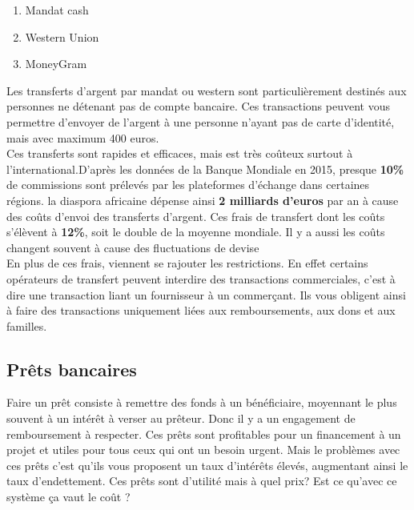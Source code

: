 \documentclass[12pt]{report}
\begin{document}
\begin{enumerate}
    \begin{enumerate}
        \item Mandat cash
        \item Western Union
        \item MoneyGram 
    \end{enumerate}
    
Les transferts d'argent par mandat ou western sont particulièrement destinés aux personnes ne détenant pas de compte bancaire. Ces transactions peuvent vous permettre d'envoyer de l'argent à une personne n'ayant pas de carte d'identité, mais avec maximum 400 euros.\\

\hspace{1cm} Ces transferts sont rapides et efficaces, mais est très coûteux surtout à l'international.D'après les données de la Banque Mondiale en 2015,  presque \textbf{10\%} de commissions sont prélevés par les plateformes d’échange dans certaines régions. la diaspora africaine dépense ainsi \textbf{2 milliards d'euros} par an à cause des coûts d'envoi des transferts d'argent.  Ces frais de transfert dont les coûts s'élèvent à \textbf{12\%}, soit le double de la moyenne mondiale. Il y a aussi les coûts changent souvent à cause des fluctuations de devise\\

\hspace{1cm} En plus de ces frais, viennent se rajouter les restrictions. En effet certains opérateurs de transfert peuvent interdire des transactions commerciales, c'est à dire une transaction liant un fournisseur à un commerçant. Ils vous obligent ainsi à faire des transactions uniquement liées aux remboursements, aux dons et aux familles.\\
    
\end{enumerate}

    \subsection{Prêts bancaires}
    
\hspace{1cm} Faire un prêt consiste à remettre des fonds à un bénéficiaire, moyennant le plus souvent à un intérêt à verser au prêteur. Donc il y a un engagement de remboursement à respecter. Ces prêts sont profitables pour un financement à un projet et utiles pour tous ceux qui ont un besoin urgent. Mais le problèmes avec ces prêts c'est qu'ils vous proposent un taux d'intérêts élevés, augmentant ainsi le taux d'endettement. Ces prêts sont d'utilité mais à quel prix? Est ce qu'avec ce système ça vaut le coût ?
\end{document}
